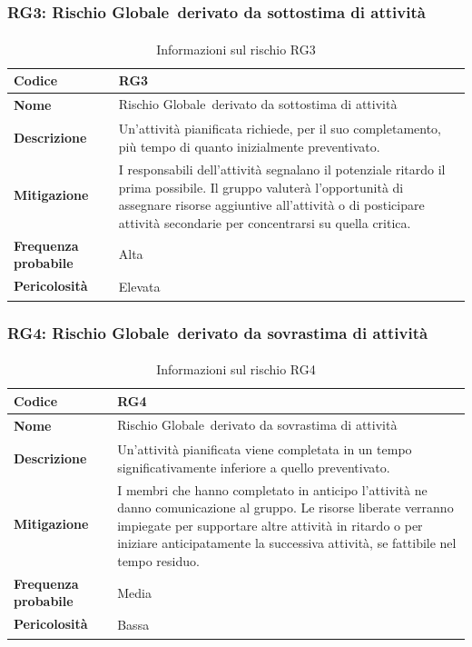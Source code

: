 \documentclass[a4paper,12pt]{article}
\newcommand{\pediceG}{\texorpdfstring{\textsubscript{\scalebox{0.6}{\textbf{G}}}~}{G}}
\begin{document}
\subsubsection{RG3: Rischio Globale\pediceG derivato da sottostima di attività}
\begin{table}[H]
\centering
\begin{tabular}{|>{\raggedright\arraybackslash}p{4cm}|>{\raggedright\arraybackslash}p{10cm}|}
\hline
\textbf{Codice} & RG3 \\
\hline
\textbf{Nome} & Rischio Globale\pediceG derivato da sottostima di attività \\
\hline
\textbf{Descrizione} & Un'attività pianificata richiede, per il suo completamento, più tempo di quanto inizialmente preventivato. \\
\hline
\textbf{Mitigazione\pediceG} & I responsabili dell'attività segnalano il potenziale ritardo il prima possibile. Il gruppo valuterà l'opportunità di assegnare risorse aggiuntive all'attività o di posticipare attività secondarie per concentrarsi su quella critica. \\
\hline
\textbf{Frequenza probabile} & Alta \\
\hline
\textbf{Pericolosità\pediceG} & Elevata \\
\hline
\end{tabular}
\caption{Informazioni sul rischio RG3}
\label{tab:rg3}
\end{table}

\subsubsection{RG4: Rischio Globale\pediceG derivato da sovrastima di attività}
\begin{table}[H]
\centering
\begin{tabular}{|>{\raggedright\arraybackslash}p{4cm}|>{\raggedright\arraybackslash}p{10cm}|}
\hline
\textbf{Codice} & RG4 \\
\hline
\textbf{Nome} & Rischio Globale\pediceG derivato da sovrastima di attività \\
\hline
\textbf{Descrizione} & Un'attività pianificata viene completata in un tempo significativamente inferiore a quello preventivato. \\
\hline
\textbf{Mitigazione\pediceG} & I membri che hanno completato in anticipo l'attività ne danno comunicazione al gruppo. Le risorse liberate verranno impiegate per supportare altre attività in ritardo o per iniziare anticipatamente la successiva attività, se fattibile nel tempo residuo. \\
\hline
\textbf{Frequenza probabile} & Media \\
\hline
\textbf{Pericolosità\pediceG} & Bassa \\
\hline
\end{tabular}
\caption{Informazioni sul rischio RG4}
\label{tab:rg4}
\end{table}
\end{document}
